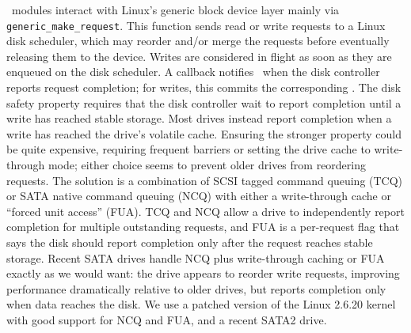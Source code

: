 \Kudos\ modules interact with Linux's generic block device layer mainly via
\verb+generic_make_request+.
%
This function sends read or write requests to a Linux disk scheduler, which
may reorder and/or merge the requests before eventually releasing them to
the device.
%
Writes are considered in flight as soon as they are enqueued on the disk
scheduler.
%
A callback notifies \Kudos\ when the disk controller reports request
completion; for writes, this commits the corresponding \patches.
%
The disk safety property requires that the disk controller wait to report
completion until a write has reached stable storage.
%
Most drives instead report completion when a write has reached the drive's
volatile cache.
%
Ensuring the stronger property could be quite expensive, requiring frequent
barriers or setting the drive cache to write-through mode; either choice
seems to prevent older drives from reordering requests.
%
The solution is a combination of SCSI tagged command queuing (TCQ) or SATA
native command queuing (NCQ) with either a write-through cache or ``forced
unit access'' (FUA).
%
TCQ and NCQ allow a drive to independently report completion for multiple
outstanding requests, and FUA is a per-request flag that says the disk
should report completion only after the request reaches stable storage.
%
Recent SATA drives handle NCQ plus write-through caching or FUA exactly as
we would want: the drive appears to reorder write requests, improving
performance dramatically relative to older drives, but reports completion
only when data reaches the disk.
%
We use a patched version of the Linux 2.6.20 kernel with good support for
NCQ and FUA, and a recent SATA2 drive.


